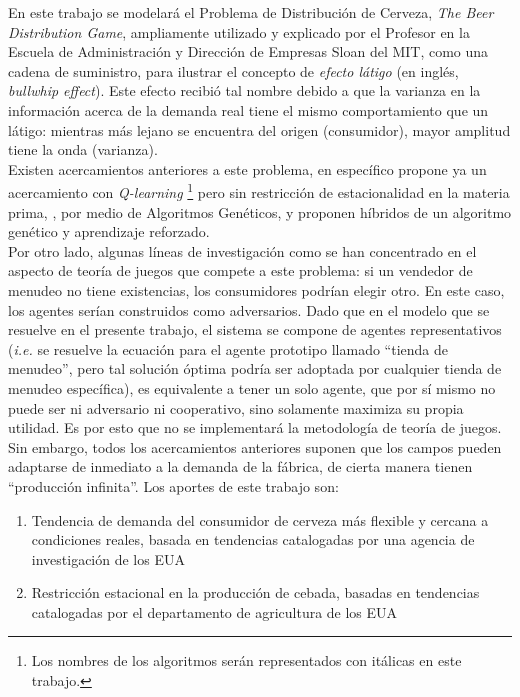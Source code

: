En este trabajo se modelará el Problema de Distribución de Cerveza, \textit{The Beer Distribution Game}, ampliamente utilizado y explicado por el Profesor \citet{Sterman} en la Escuela de Administraci\'on y Direcci\'on de Empresas Sloan del MIT, como una cadena de suministro, para ilustrar el concepto de \textit{efecto l\'atigo} (en ingl\'es, \textit{bullwhip effect}). Este efecto recibi\'o tal nombre debido a que la varianza en la informaci\'on acerca de la demanda real tiene el mismo comportamiento que un l\'atigo: mientras m\'as lejano se encuentra del origen (consumidor), mayor amplitud tiene la onda (varianza).\\

Existen acercamientos anteriores a este problema, en espec\'ifico \citet{Chaharsooghi} propone ya un acercamiento con \textit{Q-learning} \footnote{Los nombres de los algoritmos ser\'an representados con it\'alicas en este trabajo.} pero sin restricci\'on de estacionalidad en la materia prima, \citet{Strozzi}, por medio de Algoritmos Genéticos, \citet{Kimbrough} y \citet{Zarandi} proponen h\'ibridos de un algoritmo gen\'etico y aprendizaje reforzado.\\

Por otro lado, algunas l\'ineas de investigaci\'on como \citet{Busoniu} se han concentrado en el aspecto de teor\'ia de juegos que compete a este problema: si un vendedor de menudeo no tiene existencias, los consumidores podr\'ian elegir otro. En este caso, los agentes ser\'ian construidos como adversarios. Dado que en el modelo que se resuelve en el presente trabajo, el sistema se compone de agentes representativos (\textit{i.e.} se resuelve la ecuaci\'on para el agente prototipo llamado ``tienda de menudeo'', pero tal soluci\'on \'optima podr\'ia ser adoptada por cualquier tienda de menudeo espec\'ifica), es equivalente a tener un solo agente, que por s\'i mismo no puede ser ni adversario ni cooperativo, sino solamente maximiza su propia utilidad. Es por esto que no se implementar\'a la metodolog\'ia de teor\'ia de juegos.\\

Sin embargo, todos los acercamientos anteriores suponen que los campos pueden adaptarse de inmediato a la demanda de la f\'abrica, de cierta manera tienen ``producci\'on infinita''. Los aportes de este trabajo son:

\begin{enumerate}
    \item Tendencia de demanda del consumidor de cerveza m\'as flexible y cercana a condiciones reales, basada en tendencias catalogadas por una agencia de investigaci\'on de los EUA
    \item Restricci\'on estacional en la producci\'on de cebada, basadas en tendencias catalogadas por el departamento de agricultura de los EUA
\end{enumerate}

